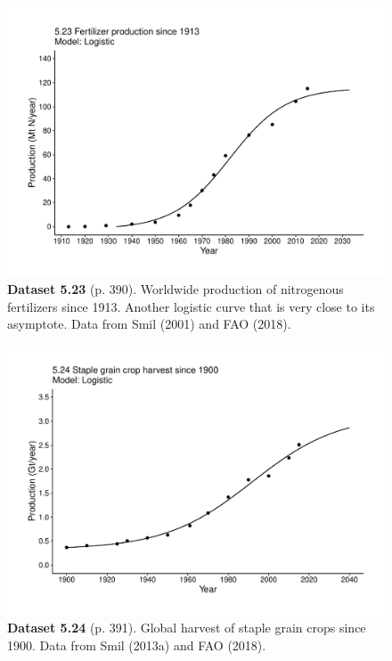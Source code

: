 \documentclass[aps,rmp,preprint,superscriptaddress,10pt,onecolumn]{article}
\begin{document}
\clearpage
\begin{figure}[h]
\includegraphics[width=\textwidth]{output/figs-ggplot/5.23.pdf}
\caption*{\textbf{Dataset 5.23} (p. 390). Worldwide production of nitrogenous fertilizers since 1913. Another logistic curve that is very close to its asymptote. Data from Smil (2001) and FAO (2018).}
\end{figure}
	
\clearpage
\begin{figure}[h]
\includegraphics[width=\textwidth]{output/figs-ggplot/5.24.pdf}
\caption*{\textbf{Dataset 5.24} (p. 391). Global harvest of staple grain crops since 1900. Data from Smil (2013a) and FAO (2018).}
\end{figure}
	
\end{document}
